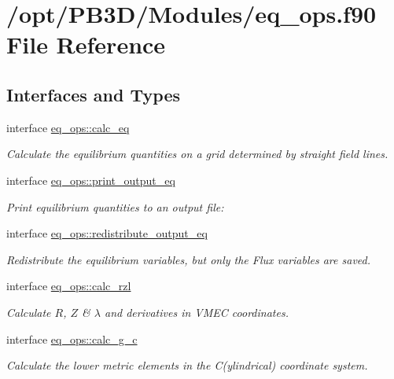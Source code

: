 \hypertarget{eq__ops_8f90}{}\section{/opt/\+P\+B3\+D/\+Modules/eq\+\_\+ops.f90 File Reference}
\label{eq__ops_8f90}
\subsection*{Interfaces and Types}
\begin{DoxyCompactItemize}
\item 
interface \hyperlink{interfaceeq__ops_1_1calc__eq}{eq\+\_\+ops\+::calc\+\_\+eq}
\begin{DoxyCompactList}\small\item\em Calculate the equilibrium quantities on a grid determined by straight field lines. \end{DoxyCompactList}\item 
interface \hyperlink{interfaceeq__ops_1_1print__output__eq}{eq\+\_\+ops\+::print\+\_\+output\+\_\+eq}
\begin{DoxyCompactList}\small\item\em Print equilibrium quantities to an output file\+: \end{DoxyCompactList}\item 
interface \hyperlink{interfaceeq__ops_1_1redistribute__output__eq}{eq\+\_\+ops\+::redistribute\+\_\+output\+\_\+eq}
\begin{DoxyCompactList}\small\item\em Redistribute the equilibrium variables, but only the Flux variables are saved. \end{DoxyCompactList}\item 
interface \hyperlink{interfaceeq__ops_1_1calc__rzl}{eq\+\_\+ops\+::calc\+\_\+rzl}
\begin{DoxyCompactList}\small\item\em Calculate $R$, $Z$ \& $\lambda$ and derivatives in V\+M\+EC coordinates. \end{DoxyCompactList}\item 
interface \hyperlink{interfaceeq__ops_1_1calc__g__c}{eq\+\_\+ops\+::calc\+\_\+g\+\_\+c}
\begin{DoxyCompactList}\small\item\em Calculate the lower metric elements in the C(ylindrical) coordinate system. \end{DoxyCompactList}\item 

\end{DoxyCompactItemize}
